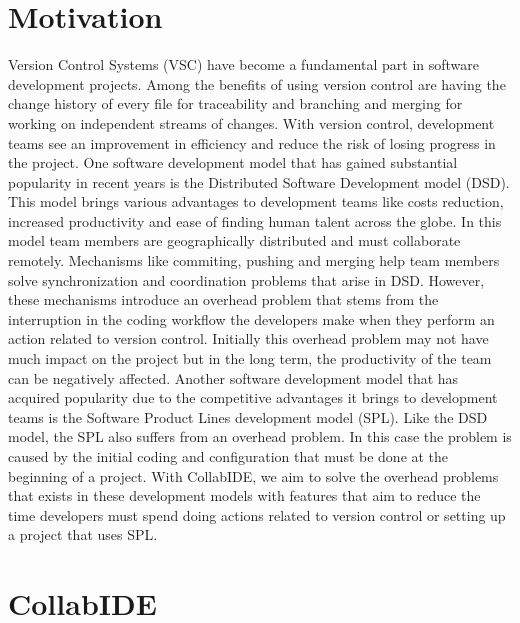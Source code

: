 \documentclass[10pt, conference, draft]{IEEEtran}
\begin{document}
\IEEEpeerreviewmaketitle


\section{Motivation}
\label{sec:motivation}

Version Control Systems (VSC) have become a fundamental part in software development projects. Among the benefits of using version control are having the change history of every file for traceability and branching and merging for working on independent streams of changes. With version control, development teams see an improvement in efficiency and reduce the risk of losing progress in the project.
One software development model that has gained substantial popularity in recent years is the Distributed Software Development model (DSD). This model brings various advantages to development teams like costs reduction, increased productivity and ease of finding human talent across the globe. In this model team members are geographically distributed and must collaborate remotely. Mechanisms like commiting, pushing and merging help team members solve synchronization and coordination problems that arise in DSD. However, these mechanisms introduce an overhead problem that stems from the interruption in the coding workflow the developers make when they perform an action related to version control. Initially this overhead problem may not have much impact on the project but in the long term, the productivity of the team can be negatively affected.
Another software development model that has acquired popularity due to the competitive advantages it brings to development teams is the Software Product Lines development model (SPL). Like the DSD model, the SPL also suffers from an overhead problem. In this case the problem is caused by the initial coding and configuration that must be done at the beginning of a project.
With CollabIDE, we aim to solve the overhead problems that exists in these development models with features that aim to reduce the time developers must spend doing actions related to version control or setting up a project that uses SPL.

\section{CollabIDE}
\label{sec:collab-ide}
\end{document}
